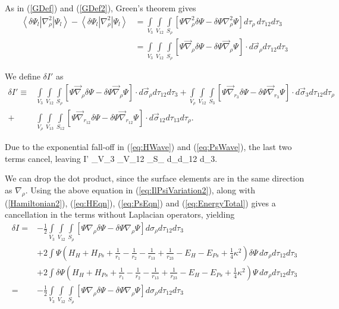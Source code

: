 \documentclass[Dissertation.tex]{subfiles}
\begin{document}
As in (\ref{GDef}) and (\ref{GDef2}), Green's theorem gives
\begin{align}
\nonumber \left<\delta\Psi_l | \nabla_\rho^2 | \Psi_l\right> - \left<\delta\Psi_l | \nabla_\rho^2 | \Psi_l\right> 
&= \int\limits_{V_3} \int\limits_{V_{12}} \int\limits_{S_\rho} \left[ \Psi \nabla_\rho^2 \delta\Psi - \delta\Psi \nabla_\rho^2 \Psi \right] d\tau_\rho \, d\tau_{12} d\tau_3 \\
&= \int\limits_{V_3} \int\limits_{V_{12}} \int\limits_{S_\rho} \left[ \Psi \vec{\nabla}_\rho \delta\Psi - \delta\Psi \vec{\nabla}_\rho \Psi \right] \cdot d\vec{\sigma}_\rho d\tau_{12} d\tau_3
\label{eq:ComplexGreensThm}
\end{align}

We define $\delta I'$ as
\begin{align}
\nonumber \delta I' \equiv &\int\limits_{V_3} \int\limits_{V_{12}} \int\limits_{S_\rho} \left[\Psi \vec{\nabla}_\rho \delta\Psi - \delta\Psi \vec{\nabla}_\rho \Psi \right] \cdot d\vec{\sigma}_\rho d\tau_{12} d\tau_3
  + \int\limits_{V_\rho} \int\limits_{V_{12}} \int\limits_{S_3} \left[\Psi \vec{\nabla}_{r_3} \delta\Psi - \delta\Psi \vec{\nabla}_{r_3} \Psi \right] \cdot d\vec{\sigma}_3 d\tau_{12} d\tau_{\rho} \\
  + &\int\limits_{V_\rho} \int\limits_{V_{13}}\int\limits_{S_{12}} \left[\Psi \vec{\nabla}_{r_{12}} \delta\Psi - \delta\Psi \vec{\nabla}_{r_{12}} \Psi \right] \cdot d\vec{\sigma}_{12} d\tau_{13} d\tau_\rho.
\end{align}

\noindent Due to the exponential fall-off in (\ref{eq:HWave}) and (\ref{eq:PsWave}), the last two terms cancel, leaving
\beq
\nonumber \delta I' \equiv \int\limits_{V_3} \int\limits_{V_{12}} \int\limits_{S_\rho} \left[\Psi \vec{\nabla}_\rho \delta\Psi - \delta\Psi \vec{\nabla}_\rho \Psi \right] \cdot d\vec{\sigma}_\rho d\tau_{12} d\tau_3.
\eeq

We can drop the dot product, since the surface elements are in the same direction as $\nabla_\rho$.
Using the above equation in (\ref{eq:IlPsiVariation2}), along with (\ref{Hamiltonian2}), (\ref{eq:HEqn}), (\ref{eq:PsEqn}) and (\ref{eq:EnergyTotal}) gives a cancellation in the terms without Laplacian operators, yielding
\begin{align}
\nonumber \delta I = &-\frac{1}{2} \int\limits_{V_3} \int\limits_{V_{12}} \int\limits_{S_\rho} \left[ \Psi \nabla_\rho \delta\Psi - \delta\Psi \nabla_\rho \Psi \right] d\sigma_\rho d\tau_{12} d\tau_3 \\
\nonumber & + 2 \int \Psi\left(H_H + H_{Ps} + \frac{1}{r_1} - \frac{1}{r_2} - \frac{1}{r_{13}} + \frac{1}{r_{23}} - E_H - E_{Ps} + \frac{1}{4} \kappa^2\right) \delta\Psi \, d\sigma_\rho d\tau_{12} d\tau_3 \\
\nonumber & + 2 \int \delta\Psi\left(H_H + H_{Ps} + \frac{1}{r_1} - \frac{1}{r_2} - \frac{1}{r_{13}} + \frac{1}{r_{23}} - E_H - E_{Ps} + \frac{1}{4} \kappa^2\right) \Psi \, d\sigma_\rho d\tau_{12} d\tau_3 \\
= &-\frac{1}{2} \int\limits_{V_3} \int\limits_{V_{12}} \int\limits_{S_\rho} \left[ \Psi \nabla_\rho \delta\Psi - \delta\Psi \nabla_\rho \Psi \right] d\sigma_\rho d\tau_{12} d\tau_3
\label{eq:ComplexIl1}
\end{align}
\end{document}
